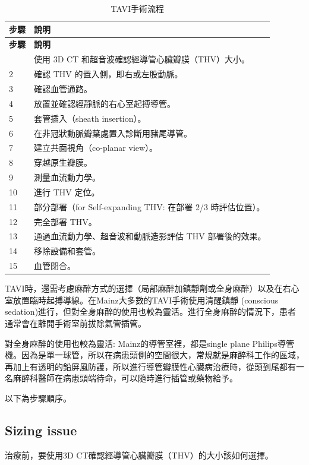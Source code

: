 \documentclass[nols]{tufte-book}
\begin{document}
\begin{longtable}{p{1cm} p{9cm}}
\caption{TAVI手術流程}
\hline
\textbf{步驟} & \textbf{說明} \\ \hline
\endfirsthead
\hline
\textbf{步驟} & \textbf{說明} \\ \hline
\endhead
\hline
\endfoot
1 & 使用 3D CT 和超音波確認經導管心臟瓣膜（THV）大小。 \\ \hline
2 & 確認 THV 的置入側，即右或左股動脈。 \\ \hline
3 & 確認血管通路。 \\ \hline
4 & 放置並確認經靜脈的右心室起搏導管。 \\ \hline
5 & 套管插入（sheath insertion）。 \\ \hline
6 & 在非冠狀動脈瓣葉處置入診斷用豬尾導管。 \\ \hline
7 & 建立共面視角（co-planar view）。 \\ \hline
8 & 穿越原生瓣膜。 \\ \hline
9 & 測量血流動力學。 \\ \hline
10 & 進行 THV 定位。 \\ \hline
11 & 部分部署（for Self-expanding THV: 在部署 2/3 時評估位置）。 \\ \hline
12 & 完全部署 THV。 \\ \hline
13 & 通過血流動力學、超音波和動脈造影評估 THV 部署後的效果。 \\ \hline
14 & 移除設備和套管。 \\ \hline
15 & 血管閉合。 \\ \hline
\end{longtable}

TAVI時，還需考慮麻醉方式的選擇（局部麻醉加鎮靜劑或全身麻醉）以及在右心室放置臨時起搏導線。在Mainz大多數的TAVI手術使用清醒鎮靜 (conscious sedation)進行，但對全身麻醉的使用也較為靈活。進行全身麻醉的情況下，患者通常會在離開手術室前拔除氣管插管。

對全身麻醉的使用也較為靈活: Mainz的導管室裡，都是single plane Philips導管機。因為是單一球管，所以在病患頭側的空間很大，常規就是麻醉科工作的區域，再加上有透明的鉛屏風防護，所以進行導管瓣膜性心臟病治療時，從頭到尾都有一名麻醉科醫師在病患頭端待命，可以隨時進行插管或藥物給予。

以下為步驟順序。

\subsection{Sizing issue}
治療前，要使用3D CT確認經導管心臟瓣膜（THV）的大小該如何選擇。
\end{document}
